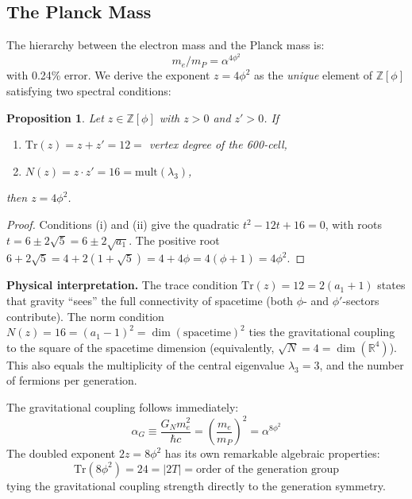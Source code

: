 \documentclass[12pt,a4paper]{article}
\newtheorem{proposition}{Proposition}
\theoremstyle{definition}
\begin{document}
\subsection{The Planck Mass}

The hierarchy between the electron mass and the Planck mass is:
\begin{equation}
\boxed{m_e / m_P = \alpha^{4\phi^2}}
\label{eq:planck}
\end{equation}
with 0.24\% error. We derive the exponent $z = 4\phi^2$ as the \emph{unique} element of $\mathbb{Z}[\phi]$ satisfying two spectral conditions:

\begin{proposition}
Let $z \in \mathbb{Z}[\phi]$ with $z > 0$ and $z' > 0$. If
\begin{enumerate}
\item[(i)] $\mathrm{Tr}(z) = z + z' = 12 = $ vertex degree of the 600-cell,
\item[(ii)] $N(z) = z \cdot z' = 16 = \mathrm{mult}(\lambda_3)$,
\end{enumerate}
then $z = 4\phi^2$.
\end{proposition}

\begin{proof}
Conditions (i) and (ii) give the quadratic $t^2 - 12t + 16 = 0$, with roots $t = 6 \pm 2\sqrt{5} = 6 \pm 2\sqrt{a_1}$. The positive root $6 + 2\sqrt{5} = 4 + 2(1 + \sqrt{5}) = 4 + 4\phi = 4(\phi + 1) = 4\phi^2$.
\end{proof}

\textbf{Physical interpretation.} The trace condition $\text{Tr}(z) = 12 = 2(a_1+1)$ states that gravity ``sees'' the full connectivity of spacetime (both $\phi$- and $\phi'$-sectors contribute). The norm condition $N(z) = 16 = (a_1-1)^2 = \dim(\text{spacetime})^2$ ties the gravitational coupling to the square of the spacetime dimension (equivalently, $\sqrt{N} = 4 = \dim(\mathbb{R}^4)$). This also equals the multiplicity of the central eigenvalue $\lambda_3 = 3$, and the number of fermions per generation.

The gravitational coupling follows immediately:
\begin{equation}
\alpha_G \equiv \frac{G_N m_e^2}{\hbar c} = \left(\frac{m_e}{m_P}\right)^2 = \alpha^{8\phi^2}
\end{equation}
The doubled exponent $2z = 8\phi^2$ has its own remarkable algebraic properties:
\begin{equation}
\text{Tr}(8\phi^2) = 24 = |2T| = \text{order of the generation group}
\end{equation}
tying the gravitational coupling strength directly to the generation symmetry.
\end{document}
